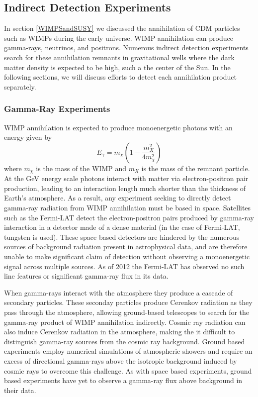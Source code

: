 \documentclass[a4paper,12pt]{article}
\begin{document}
\subsection{Indirect Detection Experiments}

In section \ref{WIMPSandSUSY} we discussed the annihilation of CDM particles such as WIMPs during the early universe.  WIMP annihilation can produce gamma-rays, neutrinos, and positrons.  Numerous indirect detection experiments search for these annihilation remnants in gravitational wells where the dark matter density is expected to be high, such a the center of the Sun.  In the following sections, we will discuss efforts to detect each annihilation product separately.

\subsubsection{Gamma-Ray Experiments}

WIMP annihilation is expected to produce monoenergetic photons with an energy given by
\begin{equation} \label{WIMP-penergy}
E_{\gamma} = m_{\chi} \left(1-\frac{m_X^2}{4m_\chi^2} \right)
\end{equation}
where $m_\chi$ is the mass of the WIMP and $m_X$ is the mass of the remnant particle.  At the GeV energy scale photons interact with matter via electron-positron pair production, leading to an interaction length much shorter than the thickness of Earth's atmosphere.  As a result, any experiment seeking to directly detect gamma-ray radiation from WIMP annihilation must be based in space.  Satellites such as the Fermi-LAT detect the electron-positron pairs produced by gamma-ray interaction in a detector made of a dense material (in the case of Fermi-LAT, tungsten is used).  These space based detectors are hindered by the numerous sources of background radiation present in astrophysical data, and are therefore unable to make significant claim of detection without observing a monoenergetic signal across multiple sources.  As of 2012 the Fermi-LAT has observed no such line features or significant gamma-ray flux in its data. \cite{Fermi-LAT} 

When gamma-rays interact with the atmosphere they produce a cascade of secondary particles.  These seconday particles produce Cerenkov radiation as they pass through the atmosphere, allowing ground-based telescopes to search for the gamma-ray product of WIMP annihilation indirectly.  Cosmic ray radiation can also induce Cerenkov radiation in the atmosphere, making the it difficult to distinguish gamma-ray sources from the cosmic ray background.  Ground based experiments employ numerical simulations of atmospheric showers and require an excess of directional gamma-rays above the isotropic background induced by cosmic rays to overcome this challenge. \cite{Knapp}  As with space based experiments, ground based experiments have yet to observe a gamma-ray flux above background in their data. \cite{HESS}
\end{document}
